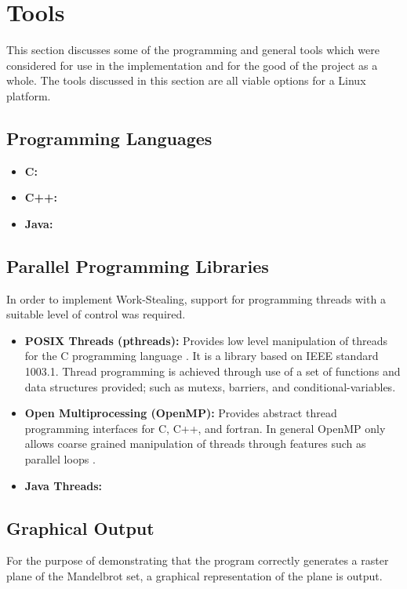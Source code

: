 \section{Tools}

This section discusses some of the programming and general tools which were considered
for use in the implementation and for the good of the project as a whole.
The tools discussed in this section are all viable options for a Linux platform.

\subsection*{Programming Languages}

\begin{itemize}
\item \textbf{C:} 
\item \textbf{C++:}
\item \textbf{Java:}
\end{itemize}

\subsection*{Parallel Programming Libraries}
In order to implement Work-Stealing, support for programming threads 
with a suitable level of control was required.

\begin{itemize}
\item \textbf{POSIX Threads (pthreads):} Provides low level manipulation of threads for the C programming language \cite{pthreadover}. 
              It is a library based on IEEE standard 1003.1. Thread programming is achieved through use of a set of functions and data
              structures provided; such as \glspl{mutex}, \glspl{barrier}, and \glspl{conditional-variable}. %
             
\item \textbf{Open Multiprocessing (OpenMP):} Provides abstract thread programming interfaces for C, C++, and fortran.
              In general OpenMP only allows coarse grained manipulation of threads through features such as parallel loops %
              \cite{ompvspthr}.

\item \textbf{Java Threads:} %
\end{itemize}

\subsection*{Graphical Output}
For the purpose of demonstrating that the program correctly generates a raster plane
of the Mandelbrot set, a graphical representation of the plane is output.

